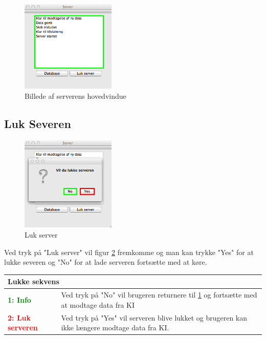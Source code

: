 \begin{figure}[htbp]
	\centering
	\includegraphics[width=0.4\textwidth]{billeder/database/server_on}
	\caption{Billede af serverens hovedvindue}
	\label{fig:server_on}
\end{figure}


\subsection*{Luk Severen}
\begin{figure}[H]
	\centering
	\includegraphics[width=0.4\textwidth]{billeder/database/databaseLogOff}
	\caption{Luk server}
	\label{fig:databselLogOff}
\end{figure}
Ved tryk på "Luk server" vil figur \ref{fig:databselLogOff} fremkomme og man kan trykke "Yes" for at lukke severen og "No" for at lade serveren fortsætte med at køre.

\begin{table}[H]
\begin{tabular}{l p{12.5cm}}
\multicolumn{2}{l}{Lukke sekvens} \\
\hline
\textcolor{green}{\textbf{1: Info}}
&Ved tryk på "No" vil brugeren returnere til \ref{fig:server_on} og fortsætte med at modtage data fra KI\\

\textcolor{red}{\textbf{2: Luk serveren}}
&Ved tryk på "Yes" vil serveren blive lukket og brugeren kan ikke længere modtage data fra KI.\\

\end{tabular}
\end{table}


